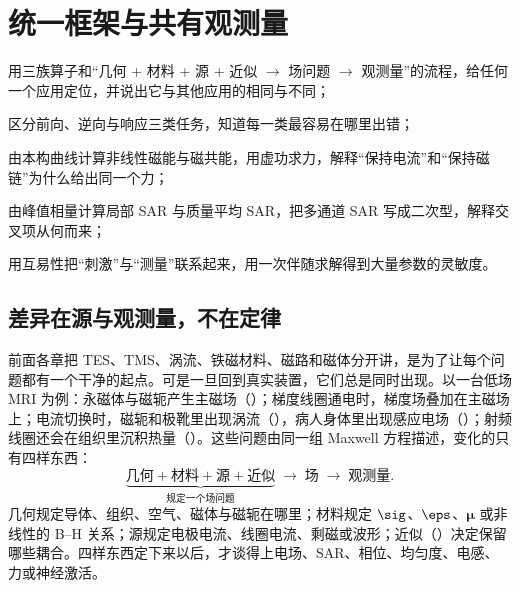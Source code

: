 \chapter{统一框架与共有观测量}\label{ch:framework}

\begin{chapterguide}
\begin{guidegoals}
\item 用三族算子和“几何 + 材料 + 源 + 近似 $\to$ 场问题 $\to$ 观测量”的流程，给任何一个应用定位，并说出它与其他应用的相同与不同；
\item 区分前向、逆向与响应三类任务，知道每一类最容易在哪里出错；
\item 由本构曲线计算非线性磁能与磁共能，用虚功求力，解释“保持电流”和“保持磁链”为什么给出同一个力；
\item 由峰值相量计算局部 SAR 与质量平均 SAR，把多通道 SAR 写成二次型，解释交叉项从何而来；
\item 用互易性把“刺激”与“测量”联系起来，用一次伴随求解得到大量参数的灵敏度。
\end{guidegoals}
\end{chapterguide}

\section{差异在源与观测量，不在定律}\label{sec:framework-families}

前面各章把 TES、TMS、涡流、铁磁材料、磁路和磁体分开讲，是为了让每个问题都有一个干净的起点。可是一旦回到真实装置，它们总是同时出现。以一台低场 MRI 为例：永磁体与磁轭产生主磁场（）；梯度线圈通电时，梯度场叠加在主磁场上；电流切换时，磁轭和极靴里出现涡流（），病人身体里出现感应电场（）；射频线圈还会在组织里沉积热量（）。这些问题由同一组 Maxwell 方程描述，变化的只有四样东西：
\begin{equation*}
\underbrace{\text{几何}+\text{材料}+\text{源}+\text{近似}}_{\text{规定一个场问题}}
\;\longrightarrow\;\text{场}\;\longrightarrow\;\text{观测量}.
\end{equation*}
几何规定导体、组织、空气、磁体与磁轭在哪里；材料规定 $\sig$、$\eps$、$\boldsymbol\mu$ 或非线性的 B--H 关系；源规定电极电流、线圈电流、剩磁或波形；近似（）决定保留哪些耦合。四样东西定下来以后，才谈得上电场、SAR、相位、均匀度、电感、力或神经激活。

